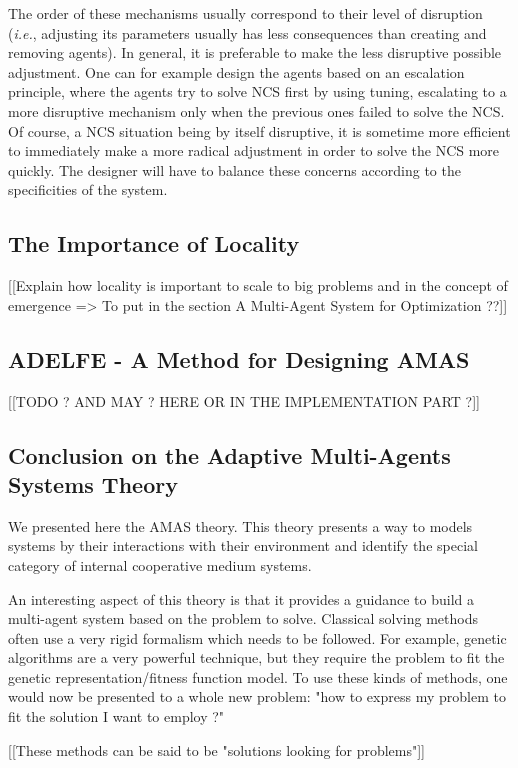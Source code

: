 The order of these mechanisms usually correspond to their level of disruption (\textit{i.e.}, adjusting its parameters usually has less consequences than creating and removing agents). In general, it is preferable to make the less disruptive possible adjustment. One can for example design the agents based on an escalation principle, where the agents try to solve NCS first by using tuning, escalating to a more disruptive mechanism only when the previous ones failed to solve the NCS. Of course, a NCS situation being by itself disruptive, it is sometime more efficient to immediately make a more radical adjustment in order to solve the NCS more quickly. The designer will have to balance these concerns according to the specificities of the system.

\subsection{The Importance of Locality}
[[Explain how locality is important to scale to big problems and in the concept of emergence => To put in the section A Multi-Agent System for Optimization ??]]

\subsection{ADELFE - A Method for Designing AMAS} 
[[TODO ? AND MAY ? HERE OR IN THE IMPLEMENTATION PART ?]]

\subsection{Conclusion on the Adaptive Multi-Agents Systems Theory}

We presented here the AMAS theory. This theory presents a way to models systems by their interactions with their environment and identify the special category of internal cooperative medium systems.

An interesting aspect of this theory  is that it provides a guidance to build a multi-agent system based on the problem to solve. Classical solving methods often use a very rigid formalism which needs to be followed. For example, genetic algorithms are a very powerful technique, but they require the problem to fit the genetic representation/fitness function model. To use these kinds of methods, one would now be presented to a whole new problem: "how to express my problem to fit the solution I want to employ ?"

[[These methods can be said to be "solutions looking for problems"]]

